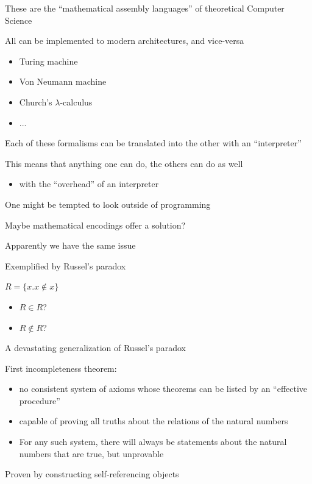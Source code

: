 \documentclass{beamer}
\begin{document}
\begin{slide}{
\item These are the ``mathematical assembly languages'' of theoretical Computer Science
\item All can be implemented to modern architectures, and vice-versa
\begin{itemize}
\item Turing machine
\item Von Neumann machine
\item Church's $\lambda$-calculus
\item ...
\end{itemize}
}\end{slide}

\begin{slide}{
\item Each of these formalisms can be translated into the other with an ``interpreter''
\item This means that anything one can do, the others can do as well
\begin{itemize}
\item with the ``overhead'' of an interpreter
\end{itemize}
}\end{slide}

\begin{slide}{
\item One might be tempted to look outside of programming
\item Maybe mathematical encodings offer a solution?
}\end{slide}

\begin{slide}{
\item Apparently we have the same issue
\item Exemplified by Russel's paradox
\item $R = \{ x . x \notin x \}$
\begin{itemize}
\item $R \in R$?
\item $R \notin R$?
\end{itemize}
}\end{slide}

\begin{slide}{
\item A devastating generalization of Russel's paradox
\item First incompleteness theorem:
\begin{itemize}
\item no consistent system of axioms whose theorems can be listed by an ``effective procedure''
\item capable of proving all truths about the relations of the natural numbers
\item For any such system, there will always be statements about the natural numbers that are true, but unprovable
\end{itemize}
\item Proven by constructing self-referencing objects
}\end{slide}
\end{document}
